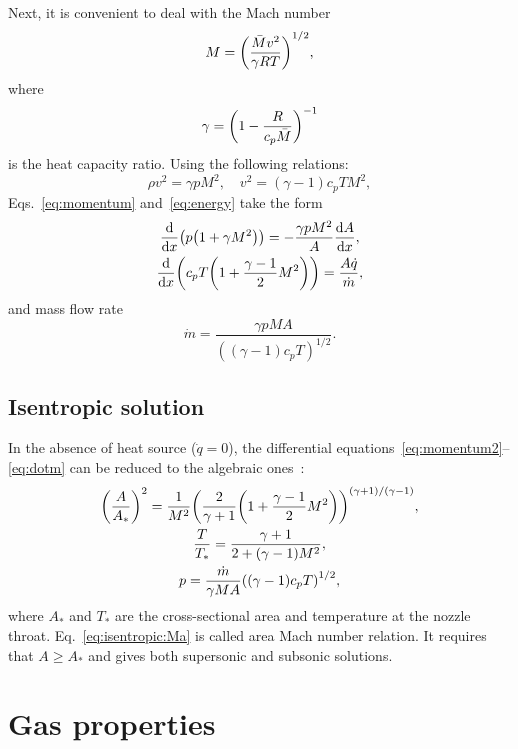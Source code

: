 \documentclass{article}
\begin{document}
Next, it is convenient to deal with the Mach number
\begin{equation}\label{eq:Mach}
    M = \qty(\frac{\bar{M}v^2}{\gamma RT})^{1/2},
\end{equation}
where
\begin{equation}\label{eq:gamma}
    \gamma = \qty(1-\frac{R}{c_p\bar{M}})^{-1}
\end{equation}
is the heat capacity ratio.
Using the following relations:
\begin{equation*}
    \rho v^2 = \gamma p M^2, \quad v^2 = (\gamma-1)c_pT M^2,
\end{equation*}
Eqs.~\eqref{eq:momentum} and~\eqref{eq:energy} take the form
\begin{gather}
    \dv{x}(p\qty(1 + \gamma M^2)) = -\frac{\gamma p M^2}{A}\dv{A}{x}, \label{eq:momentum2}\\
    \dv{x}(c_pT\qty(1 + \frac{\gamma-1}{2}M^2)) = \frac{A\dot{q}}{\dot{m}}, \label{eq:energy2}
\end{gather}
and mass flow rate
\begin{equation}\label{eq:dotm}
    \dot{m} = \frac{\gamma pMA}{((\gamma-1)c_pT)^{1/2}}.
\end{equation}

\subsection{Isentropic solution}

In the absence of heat source ($\dot{q}=0$), the differential equations~\eqref{eq:momentum2}--\eqref{eq:dotm}
can be reduced to the algebraic ones~\cite[Sec.~5.4]{anderson1990modern}:
\begin{gather}
    \qty(\frac{A}{A_*})^2 = \frac1{M^2}
        \qty(\frac{2}{\gamma+1}\qty(1+\frac{\gamma-1}{2}M^2))^{(\gamma+1)/(\gamma-1)}, \label{eq:isentropic:Ma}\\
    \frac{T}{T_*} = \frac{\gamma+1}{2 + (\gamma-1)M^2}, \label{eq:isentropic:T}\\
    p = \frac{\dot{m}}{\gamma MA}\qty((\gamma-1)c_pT)^{1/2}, \label{eq:isentropic:P}
\end{gather}
where $A_*$ and $T_*$ are the cross-sectional area and temperature at the nozzle throat.
Eq.~\eqref{eq:isentropic:Ma} is called area Mach number relation.
It requires that $A\geq A_*$ and gives both supersonic and subsonic solutions.

\section{Gas properties}
\end{document}

